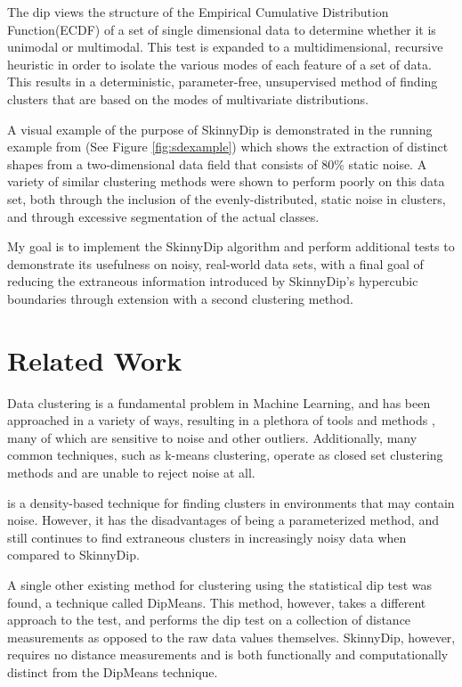 \documentclass{sig-alternate-05-2015}
\begin{document}
The dip views the structure of the Empirical Cumulative Distribution Function(ECDF) of a set of single dimensional data to determine whether it is unimodal or multimodal. This test is expanded to a multidimensional, recursive heuristic in order to isolate the various modes of each feature of a set of data. This results in a deterministic, parameter-free, unsupervised method of finding clusters that are based on the modes of multivariate distributions. 

A visual example of the purpose of SkinnyDip is demonstrated in the running example from \cite{skinnydip} (See Figure \ref{fig:sdexample}) which shows the extraction of distinct shapes from a two-dimensional data field that consists of 80\% static noise. A variety of similar clustering methods were shown to perform poorly on this data set, both through the inclusion of the evenly-distributed, static noise in clusters, and through excessive segmentation of the actual classes.

My goal is to implement the SkinnyDip algorithm and perform additional tests to demonstrate its usefulness on noisy, real-world data sets, with a final goal of reducing the extraneous information introduced by SkinnyDip's hypercubic boundaries through extension with a second clustering method.


\section{Related Work}
Data clustering is a fundamental problem in Machine Learning, and has been approached in a variety of ways, resulting in a plethora of tools and methods \cite{ClusteringMethods}, many of which are sensitive to noise and other outliers. Additionally, many common techniques, such as k-means clustering, operate as closed set clustering methods and are unable to reject noise at all.

\cite{DBSCAN} is a density-based technique for finding clusters in environments that may contain noise. However, it has the disadvantages of being a parameterized method, and still continues to find extraneous clusters in increasingly noisy data when compared to SkinnyDip.

A single other existing method for clustering using the statistical dip test was found, a technique called DipMeans\cite{dipmeans}. This method, however, takes a different approach to the test, and performs the dip test on a collection of distance measurements as opposed to the raw data values themselves. SkinnyDip, however, requires no distance measurements  and is both functionally and computationally distinct from the DipMeans technique.
\end{document}
